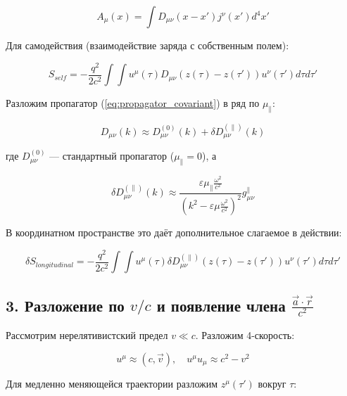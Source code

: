 \documentclass[12pt, a4paper]{article}
\begin{document}
\begin{equation}
A_\mu(x) = \int D_{\mu\nu}(x - x') j^\nu(x') d^4x'
\label{eq:A_via_propagator}
\end{equation}

Для самодействия (взаимодействие заряда с собственным полем):

\begin{equation}
S_{self} = -\frac{q^2}{2c^2} \int\int u^\mu(\tau) D_{\mu\nu}(z(\tau) - z(\tau')) u^\nu(\tau') d\tau d\tau'
\label{eq:action_self}
\end{equation}

Разложим пропагатор (\ref{eq:propagator_covariant}) в ряд по $\mu_{\parallel}$:

\begin{equation}
D_{\mu\nu}(k) \approx D_{\mu\nu}^{(0)}(k) + \delta D_{\mu\nu}^{(\parallel)}(k)
\label{eq:propagator_expansion}
\end{equation}

где $D_{\mu\nu}^{(0)}$ — стандартный пропагатор ($\mu_{\parallel} = 0$), а

\begin{equation}
\delta D_{\mu\nu}^{(\parallel)}(k) \approx \frac{\varepsilon\mu_{\parallel}\frac{\omega^2}{c^2}}{\left(k^2 - \varepsilon\mu\frac{\omega^2}{c^2}\right)^2} g_{\mu\nu}^{\parallel}
\label{eq:propagator_correction}
\end{equation}

В координатном пространстве это даёт дополнительное слагаемое в действии:

\begin{equation}
\delta S_{longitudinal} = -\frac{q^2}{2c^2} \int\int u^\mu(\tau) \delta D_{\mu\nu}^{(\parallel)}(z(\tau) - z(\tau')) u^\nu(\tau') d\tau d\tau'
\label{eq:action_longitudinal}
\end{equation}

\subsection{3. Разложение по $v/c$ и появление члена $\frac{\vec{a}\cdot\vec{r}}{c^2}$}

Рассмотрим нерелятивистский предел $v \ll c$. Разложим 4-скорость:

\begin{equation}
u^\mu \approx (c, \vec{v}), \quad u^\mu u_\mu \approx c^2 - v^2
\end{equation}

Для медленно меняющейся траектории разложим $z^\mu(\tau')$ вокруг $\tau$:
\end{document}
